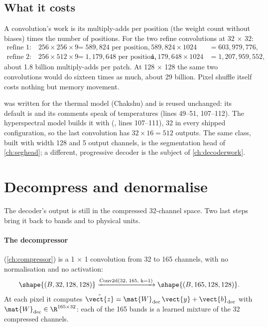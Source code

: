 \subsection{What it costs}

A convolution's work is its multiply-adds per position (the weight count without biases) times the
number of positions. For the two refine convolutions at 32 $\times$ 32:
\begin{align*}
\text{refine 1:}\quad 256 \times 256 \times 9 &= 589{,}824 \text{ per position}, & 589{,}824 \times 1024 &= 603{,}979{,}776,\\
\text{refine 2:}\quad 256 \times 512 \times 9 &= 1{,}179{,}648 \text{ per position}, & 1{,}179{,}648 \times 1024 &= 1{,}207{,}959{,}552,
\end{align*}
about 1.8 billion multiply-adds per patch\tagC. At 128 $\times$ 128 the same two convolutions would do
sixteen times as much, about 29 billion. Pixel shuffle itself costs nothing but memory movement.

\begin{sourcenote}
 was written for the thermal model (Chakshu) and is reused unchanged: its default
is  and its comments speak of temperatures (lines 49--51, 107--112). The
hyperspectral model builds it with 
(, lines 107--111), 32 in every shipped configuration, so the last
convolution has $32 \times 16 = 512$ outputs. The same class, built with width 128 and 5 output
channels, is the segmentation head of \cref{ch:seghead}; a different, progressive decoder is the subject
of \cref{ch:decoderwork}.
\end{sourcenote}

\section{Decompress and denormalise}\label{sec:decoder:back}

The decoder's output is still in the compressed 32-channel space. Two last steps bring it back to
bands and to physical units.

\paragraph{The decompressor} (\cref{ch:compressor}) is a 1 $\times$ 1 convolution from 32 to 165
channels, with no normalisation and no activation:
\[
\shape{(B, 32, 128, 128)} \xrightarrow{\text{Conv2d(32, 165, k=1)}} \shape{(B, 165, 128, 128)} .
\]
At each pixel it computes $\hat{\vect{z}} = \mat{W}_{\text{dec}}\, \vect{y} + \vect{b}_{\text{dec}}$ with
$\mat{W}_{\text{dec}} \in \R^{165 \times 32}$: each of the 165 bands is a learned mixture of the 32
compressed channels.

